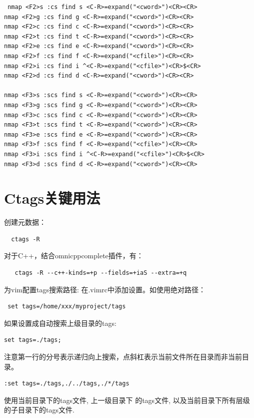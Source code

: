 \begin{verbatim}
 nmap <F2>s :cs find s <C-R>=expand("<cword>")<CR><CR>
nmap <F2>g :cs find g <C-R>=expand("<cword>")<CR><CR>
nmap <F2>c :cs find c <C-R>=expand("<cword>")<CR><CR>
nmap <F2>t :cs find t <C-R>=expand("<cword>")<CR><CR>
nmap <F2>e :cs find e <C-R>=expand("<cword>")<CR><CR>
nmap <F2>f :cs find f <C-R>=expand("<cfile>")<CR><CR>
nmap <F2>i :cs find i ^<C-R>=expand("<cfile>")<CR>$<CR>
nmap <F2>d :cs find d <C-R>=expand("<cword>")<CR><CR>

nmap <F3>s :scs find s <C-R>=expand("<cword>")<CR><CR>
nmap <F3>g :scs find g <C-R>=expand("<cword>")<CR><CR>
nmap <F3>c :scs find c <C-R>=expand("<cword>")<CR><CR>
nmap <F3>t :scs find t <C-R>=expand("<cword>")<CR><CR>
nmap <F3>e :scs find e <C-R>=expand("<cword>")<CR><CR>
nmap <F3>f :scs find f <C-R>=expand("<cfile>")<CR><CR>
nmap <F3>i :scs find i ^<C-R>=expand("<cfile>")<CR>$<CR>
nmap <F3>d :scs find d <C-R>=expand("<cword>")<CR><CR>

\end{verbatim}









\section{Ctags关键用法}

创建元数据：
\begin{verbatim}
  ctags -R
\end{verbatim}
  对于C++，结合omnicppcomplete插件，有：
\begin{verbatim}
   ctags -R --c++-kinds=+p --fields=+iaS --extra=+q
\end{verbatim}

为vim配置tags搜索路径:
在.vimrc中添加设置。如使用绝对路径：
\begin{verbatim}
 set tags=/home/xxx/myproject/tags
\end{verbatim}

如果设置成自动搜索上级目录的tags:
\begin{verbatim}
set tags=./tags;
\end{verbatim}
注意第一行的分号表示递归向上搜索，点斜杠表示当前文件所在目录而非当前目录。

\begin{verbatim}
:set tags=./tags,./../tags,./*/tags
\end{verbatim}
使用当前目录下的tags文件, 上一级目录下
的tags文件, 以及当前目录下所有层级的子目录下的tags文件.


